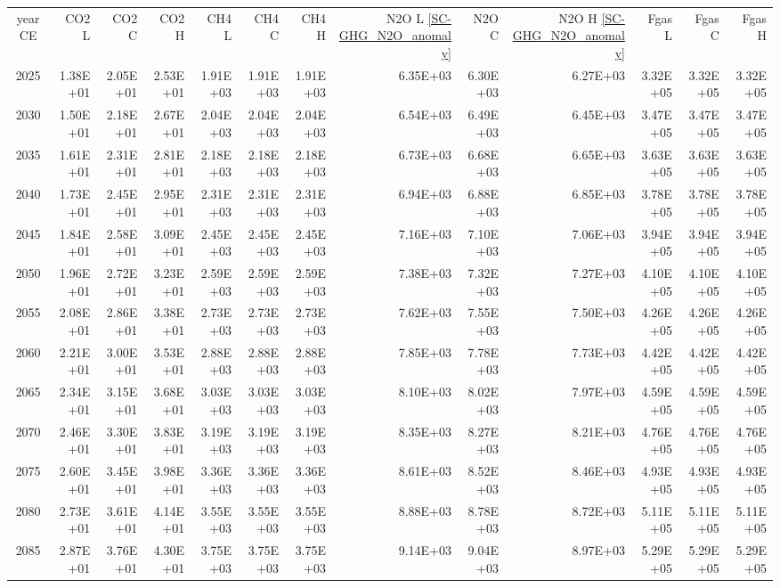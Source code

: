 \documentclass{article}
\begin{document}
\begin{table}
\begin{tabular}{crrr|rrr|rrr|rrr}
year CE  & CO2 L    & CO2 C    & CO2 H    & CH4 L    & CH4 C    & CH4 H    & N2O L \ref{SC-GHG_N2O_anomaly}     & N2O C      & N2O H \ref{SC-GHG_N2O_anomaly}    & Fgas L   & Fgas C   & Fgas H   \\
2025     & 1.38E+01 & 2.05E+01 & 2.53E+01 & 1.91E+03 & 1.91E+03 & 1.91E+03 & 6.35E+03 & 6.30E+03 & 6.27E+03 & 3.32E+05 & 3.32E+05 & 3.32E+05 \\
2030     & 1.50E+01 & 2.18E+01 & 2.67E+01 & 2.04E+03 & 2.04E+03 & 2.04E+03 & 6.54E+03 & 6.49E+03 & 6.45E+03 & 3.47E+05 & 3.47E+05 & 3.47E+05 \\
2035     & 1.61E+01 & 2.31E+01 & 2.81E+01 & 2.18E+03 & 2.18E+03 & 2.18E+03 & 6.73E+03 & 6.68E+03 & 6.65E+03 & 3.63E+05 & 3.63E+05 & 3.63E+05 \\
2040     & 1.73E+01 & 2.45E+01 & 2.95E+01 & 2.31E+03 & 2.31E+03 & 2.31E+03 & 6.94E+03 & 6.88E+03 & 6.85E+03 & 3.78E+05 & 3.78E+05 & 3.78E+05 \\
2045     & 1.84E+01 & 2.58E+01 & 3.09E+01 & 2.45E+03 & 2.45E+03 & 2.45E+03 & 7.16E+03 & 7.10E+03 & 7.06E+03 & 3.94E+05 & 3.94E+05 & 3.94E+05 \\
2050     & 1.96E+01 & 2.72E+01 & 3.23E+01 & 2.59E+03 & 2.59E+03 & 2.59E+03 & 7.38E+03 & 7.32E+03 & 7.27E+03 & 4.10E+05 & 4.10E+05 & 4.10E+05 \\
2055     & 2.08E+01 & 2.86E+01 & 3.38E+01 & 2.73E+03 & 2.73E+03 & 2.73E+03 & 7.62E+03 & 7.55E+03 & 7.50E+03 & 4.26E+05 & 4.26E+05 & 4.26E+05 \\
2060     & 2.21E+01 & 3.00E+01 & 3.53E+01 & 2.88E+03 & 2.88E+03 & 2.88E+03 & 7.85E+03 & 7.78E+03 & 7.73E+03 & 4.42E+05 & 4.42E+05 & 4.42E+05 \\
2065     & 2.34E+01 & 3.15E+01 & 3.68E+01 & 3.03E+03 & 3.03E+03 & 3.03E+03 & 8.10E+03 & 8.02E+03 & 7.97E+03 & 4.59E+05 & 4.59E+05 & 4.59E+05 \\
2070     & 2.46E+01 & 3.30E+01 & 3.83E+01 & 3.19E+03 & 3.19E+03 & 3.19E+03 & 8.35E+03 & 8.27E+03 & 8.21E+03 & 4.76E+05 & 4.76E+05 & 4.76E+05 \\
2075     & 2.60E+01 & 3.45E+01 & 3.98E+01 & 3.36E+03 & 3.36E+03 & 3.36E+03 & 8.61E+03 & 8.52E+03 & 8.46E+03 & 4.93E+05 & 4.93E+05 & 4.93E+05 \\
2080     & 2.73E+01 & 3.61E+01 & 4.14E+01 & 3.55E+03 & 3.55E+03 & 3.55E+03 & 8.88E+03 & 8.78E+03 & 8.72E+03 & 5.11E+05 & 5.11E+05 & 5.11E+05 \\
2085     & 2.87E+01 & 3.76E+01 & 4.30E+01 & 3.75E+03 & 3.75E+03 & 3.75E+03 & 9.14E+03 & 9.04E+03 & 8.97E+03 & 5.29E+05 & 5.29E+05 & 5.29E+05 \\

\end{tabular}
\end{table}
\end{document}
